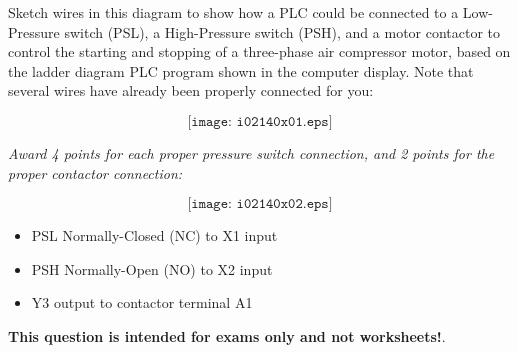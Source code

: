 

Sketch wires in this diagram to show how a PLC could be connected to a Low-Pressure switch (PSL), a High-Pressure switch (PSH), and a motor contactor to control the starting and stopping of a three-phase air compressor motor, based on the ladder diagram PLC program shown in the computer display.  Note that several wires have already been properly connected for you:  

$$\texttt{[image: i02140x01.eps]}$$







{\it Award 4 points for each proper pressure switch connection, and 2 points for the proper contactor connection:}

$$\texttt{[image: i02140x02.eps]}$$

\begin{itemize}
\item{} PSL Normally-Closed (NC) to X1 input
\item{} PSH Normally-Open (NO) to X2 input
\item{} Y3 output to contactor terminal A1
\end{itemize}







{\bf This question is intended for exams only and not worksheets!}.



